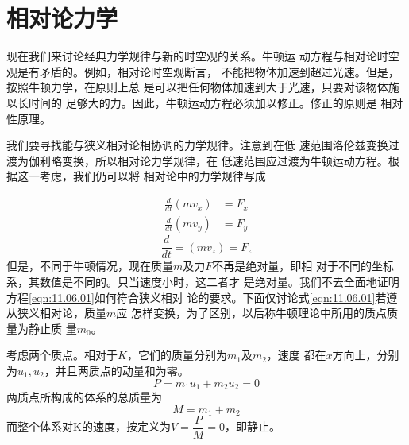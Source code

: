 \section{相对论力学}\label{sec:11.06}

现在我们来讨论经典力学规律与新的时空观的关系。牛顿运
动方程与相对论时空观是有矛盾的。例如，相对论时空观断言，
不能把物体加速到超过光速。但是，按照牛顿力学，在原则上总
是可以把任何物体加速到大于光速，只要对该物体施以长时间的
足够大的力。因此，牛顿运动方程必须加以修正。修正的原则是
相对性原理。

我们要寻找能与狭义相对论相协调的力学规律。注意到在低
速范围洛伦兹变换过渡为伽利略变换，所以相对论力学规律，在
低速范围应过渡为牛顿运动方程。根据这一考虑，我们仍可以将
相对论中的力学规律写成

\begin{equation}\label{eqn:11.06.01}
    \begin{split}
        \frac { d } { d t } \left( m v _ { x } \right) &= F _ { x } \\
        \frac { d } { d t } \left( m v _ { y } \right) &= F _ { y }
    \end{split}
\end{equation}
\begin{equation*}
    \frac { d } { d t } = \left( m v _ { z } \right) = F _ { z }
\end{equation*}
但是，不同于牛顿情况，现在质量$ m $及力$ F $不再是绝对量，即相
对于不同的坐标系，其数值是不同的。只当速度小时，这二者才
是绝对量。我们不去全面地证明方程\eqref{eqn:11.06.01}如何符合狭义相对
论的要求。下面仅讨论式\eqref{eqn:11.06.01}若遵从狭义相对论，质量$ m $应
怎样变换，为了区别，以后称牛顿理论中所用的质点质量为静止质
量$ m _ 0 $。

考虑两个质点。相对于$ K $，它们的质量分别为$ m_1 $及$ m_2 $，速度
都在$ x $方向上，分别为$ u_1, u_2 $，并且两质点的动量和为零。
\begin{equation}\label{eqn:11.06.02}
    P = m _ { 1 } u _ { 1 } + m _ { 2 } u _ { 2 } = 0
\end{equation}
两质点所构成的体系的总质量为
\begin{equation}\label{eqn:11.06.03}
    M = m _ { 1 } + m _ { 2 }
\end{equation}
而整个体系对K的速度，按定义为$ V = \dfrac { P } { M } = 0 $，即静止。


